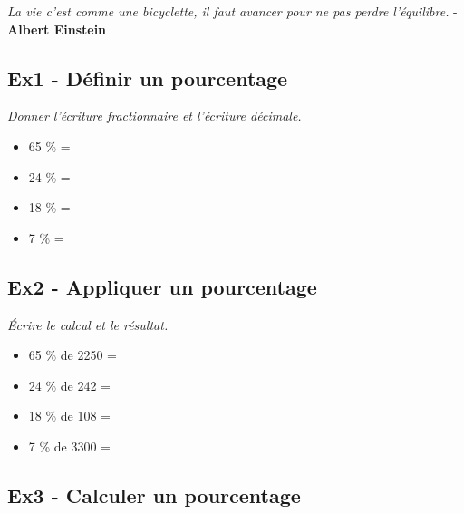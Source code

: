 \begin{center}
  \textit{La vie c’est comme une bicyclette, il faut avancer pour ne pas perdre l’équilibre.} - \textbf{Albert Einstein}
\end{center}


\subsection*{Ex1 - Définir un pourcentage}

\textit{Donner l'écriture fractionnaire et l'écriture décimale.}

\begin{multicols}{2}
\begin{itemize}[label={$\bullet$}]
  \item 65 \% = \dotfill \\ \Pointilles[1]
  \item 24 \% = \dotfill \\ \Pointilles[1] \columnbreak 
  \item 18 \% = \dotfill \\ \Pointilles[1]
  \item  7 \% = \dotfill \\ \Pointilles[1]
\end{itemize} 
\end{multicols}

\subsection*{Ex2 - Appliquer un pourcentage}

\textit{Écrire le calcul et le résultat.}

\begin{multicols}{2}
  \begin{itemize}[label={$\bullet$}]
    \item 65 \% de 2250 = \dotfill \\ \Pointilles[1]
    \item 24 \% de  242 = \dotfill \\ \Pointilles[1] \columnbreak 
    \item 18 \% de  108 = \dotfill \\ \Pointilles[1]
    \item  7 \% de 3300 = \dotfill \\ \Pointilles[1]
  \end{itemize} 
  \end{multicols}

\subsection*{Ex3 - Calculer un pourcentage}

